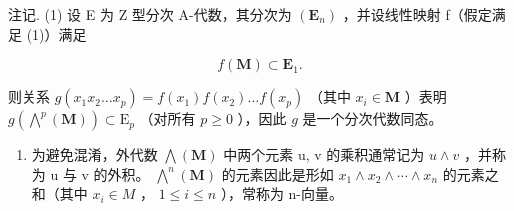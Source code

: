 注记. (1) 设 E 为 Z 型分次 A-代数，其分次为 \((\mathbf{E}_{n})\) ，并设线性映射 f（假定满足 (1)）满足

\[
f (\mathbf {M}) \subset \mathbf {E} _ {1}.\tag{2}
\]

则关系 \(g(x_1x_2 \ldots x_p) = f(x_1)f(x_2) \ldots f(x_p)\) （其中 \(x_i \in \mathbf{M}\) ）表明 \(g(\bigwedge^p (\mathbf{M})) \subset \mathrm{E}_p\) （对所有 \(p \geqslant 0\) ），因此 \(g\) 是一个分次代数同态。

\begin{enumerate}
\def\labelenumi{(\arabic{enumi})}
\setcounter{enumi}{1}
\tightlist
\item
  为避免混淆，外代数 \(\bigwedge(\mathbf{M})\) 中两个元素 u, v 的乘积通常记为 \(u \wedge v\) ，并称为 u 与 v 的外积。 \(\bigwedge^{n}(\mathbf{M})\) 的元素因此是形如 \(x_{1} \wedge x_{2} \wedge \cdots \wedge x_{n}\) 的元素之和（其中 \(x_{i} \in M\) ， \(1 \leqslant i \leqslant n\) ），常称为 n-向量。
\end{enumerate}


